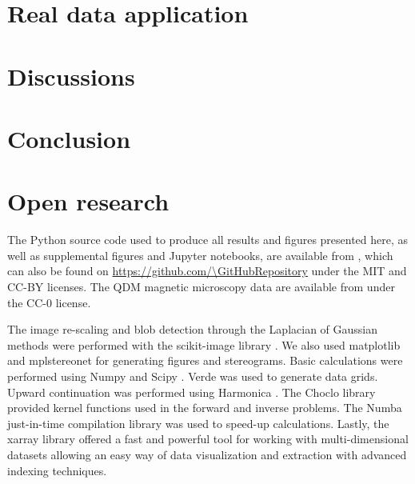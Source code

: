 \section{Real data application}

\section{Discussions}


\section{Conclusion}



\section{Open research}

The Python source code used to produce all results and figures presented here, as well as supplemental figures and Jupyter notebooks, are available from \citet{sourcearchive}, which can also be found on \url{https://github.com/\GitHubRepository} under the MIT and CC-BY licenses.
The QDM magnetic microscopy data are available
from \citet{janinedata} under the CC-0 license.

The image re-scaling and blob detection through the Laplacian of Gaussian
methods were performed with the scikit-image library \citep{VanderWalt2014}.
We also used matplotlib \citep{Hunter2007} and mplstereonet \citep{mplstereonet}
for generating figures and stereograms.
Basic calculations were performed using Numpy \citep{Harris2020} and Scipy
\citep{2020SciPy-NMeth}.
Verde \citep{verde2018} was used to generate data grids.
Upward continuation was performed using Harmonica \citep{harmonica2020}.
The Choclo library \citep{choclo2022} provided kernel functions used in the
forward and inverse problems.
The Numba just-in-time compilation library \citep{lam2015numba} was used to
speed-up calculations.
Lastly, the xarray library \citep{hoyer2017xarray} offered a fast and powerful
tool for working with multi-dimensional datasets allowing an easy way of data
visualization and extraction with advanced indexing techniques.



